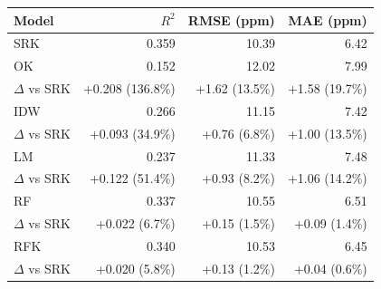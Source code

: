 \begin{tabular}{lrrr}
\hline
Model & $R^2$ & RMSE (ppm) & MAE (ppm) \\
\hline
SRK & 0.359 & 10.39 & 6.42 \\
OK & 0.152 & 12.02 & 7.99 \\
\quad $\Delta$ vs SRK & +0.208 (136.8\%) & +1.62 (13.5\%) & +1.58 (19.7\%) \\
IDW & 0.266 & 11.15 & 7.42 \\
\quad $\Delta$ vs SRK & +0.093 (34.9\%) & +0.76 (6.8\%) & +1.00 (13.5\%) \\
LM & 0.237 & 11.33 & 7.48 \\
\quad $\Delta$ vs SRK & +0.122 (51.4\%) & +0.93 (8.2\%) & +1.06 (14.2\%) \\
RF & 0.337 & 10.55 & 6.51 \\
\quad $\Delta$ vs SRK & +0.022 (6.7\%) & +0.15 (1.5\%) & +0.09 (1.4\%) \\
RFK & 0.340 & 10.53 & 6.45 \\
\quad $\Delta$ vs SRK & +0.020 (5.8\%) & +0.13 (1.2\%) & +0.04 (0.6\%) \\
\hline
\end{tabular}
